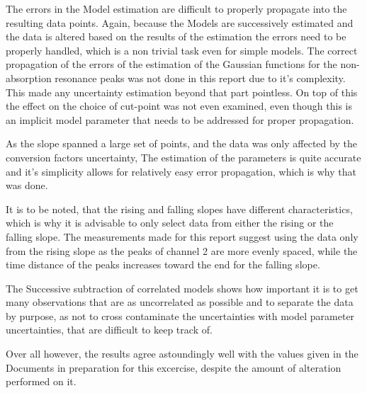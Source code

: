 The errors in the Model estimation are difficult to properly propagate into the resulting data points. Again, because the Models are successively
estimated and the data is altered based on the results of the estimation the errors need to be properly handled, which is a non trivial task even for
simple models. The correct propagation of the errors of the estimation of the Gaussian functions for the non-absorption resonance peaks was not done
in this report due to it's complexity. This made any uncertainty estimation beyond that part pointless. On top of this the effect on the choice of
cut-point was not even examined, even though this is an implicit model parameter that needs to be addressed for proper propagation.

As the slope spanned a large set of points, and the data was only affected by the conversion factors uncertainty, The estimation of the parameters is
quite accurate and it's simplicity allows for relatively easy error propagation, which is why that was done.

It is to be noted, that the rising and falling slopes have different characteristics, which is why it is advisable to only select data from either the
rising or the falling slope. The measurements made for this report suggest using the data only from the rising slope as the peaks of channel 2 are
more evenly spaced, while the time distance of the peaks increases toward the end for the falling slope.

The Successive subtraction of correlated models shows how important it is to get many observations that are as uncorrelated as possible and to
separate the data by purpose, as not to cross contaminate the uncertainties with model parameter uncertainties, that are difficult to keep track of.

Over all however, the results agree astoundingly well with the values given in the Documents in preparation for this excercise, despite the amount of
alteration performed on it.
